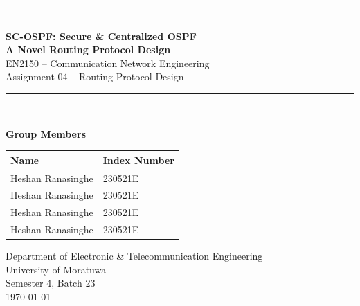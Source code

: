 \documentclass[12pt,a4paper]{article}
\begin{document}
\begin{titlepage}
\centering
\vspace*{0.5cm}

{\color{primaryblue}\rule{\textwidth}{1.5pt}}\\[0.5cm]
{\color{primaryblue}\Huge\bfseries SC-OSPF: Secure \& Centralized OSPF}\\[0.3cm]
{\color{primaryblue}\Large\bfseries A Novel Routing Protocol Design}\\[0.3cm]
{\color{accentteal}\large EN2150 -- Communication Network Engineering}\\[0.2cm]
{\color{darkgray}\large Assignment 04 -- Routing Protocol Design}\\[0.5cm]
{\color{primaryblue}\rule{\textwidth}{1.5pt}}\\[1cm]

\begin{mdframed}[backgroundcolor=lightblue,linecolor=primaryblue]
\centering
{\color{primaryblue}\large\bfseries Group Members}\\[0.5cm]
\begin{tabular}{ll}
\toprule
\textbf{Name} & \textbf{Index Number} \\
\midrule
Heshan Ranasinghe & 230521E \\
Heshan Ranasinghe & 230521E \\
Heshan Ranasinghe & 230521E \\
Heshan Ranasinghe & 230521E \\
\bottomrule
\end{tabular}
\end{mdframed}

\vspace{0.8cm}
{\color{darkgray}\large
  Department of Electronic \& Telecommunication Engineering\\[0.2cm]
  University of Moratuwa\\[0.2cm]
  Semester 4, Batch 23\\[0.2cm]
  \today
}\\[1.2cm]


\end{titlepage}
\end{document}
